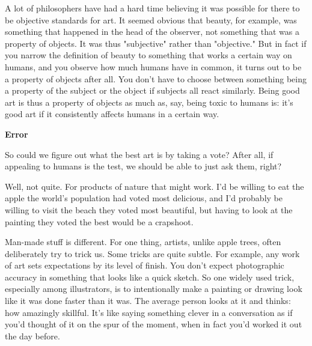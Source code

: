 A lot of philosophers have
                  had a hard time believing it was possible for there to be
                  objective standards for art. It seemed obvious that beauty,
                  for example, was something that happened in the head of the
                  observer, not something that was a property of objects. It was
                  thus "subjective" rather than "objective." But in fact if you
                  narrow the definition of beauty to something that works a
                  certain way on humans, and you observe how much humans have in
                  common, it turns out to be a property of objects after all.
                  You don't have to choose between something being a property of
                  the subject or the object if subjects all react similarly.
                  Being good art is thus a property of objects as much as, say,
                  being toxic to humans is: it's good art if it consistently
                  affects humans in a certain way.


                  \textbf{Error}

So could we figure out what the best
                  art is by taking a vote? After all, if appealing to humans is
                  the test, we should be able to just ask them, right?

Well,
                  not quite. For products of nature that might work. I'd be
                  willing to eat the apple the world's population had voted most
                  delicious, and I'd probably be willing to visit the beach they
                  voted most beautiful, but having to look at the painting they
                  voted the best would be a crapshoot.

Man-made stuff
                  is different. For one thing, artists, unlike apple trees,
                  often deliberately try to trick us. Some tricks are quite
                  subtle. For example, any work of art sets expectations by its
                  level of finish. You don't expect photographic accuracy in
                  something that looks like a quick sketch. So one widely used
                  trick, especially among illustrators, is to intentionally make
                  a painting or drawing look like it was done faster than it
                  was. The average person looks at it and thinks: how amazingly
                  skillful. It's like saying something clever in a conversation
                  as if you'd thought of it on the spur of the moment, when in
                  fact you'd worked it out the day before.

